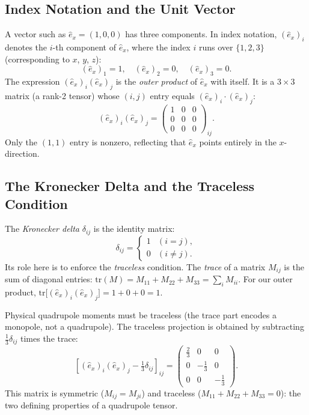 \documentclass[%
 reprint, amsmath,amssymb, aps, prb, ]{revtex4-2}
\numberwithin{equation}{section}
\newcommand{\ehat}[1]{\hat{e}_{#1}}
\begin{document}
\subsection{Index Notation and the Unit Vector}

A vector such as $\ehat{x} = (1, 0, 0)$ has three components.
In index notation, $(\ehat{x})_i$ denotes the $i$-th component of $\ehat{x}$, where the index $i$ runs over $\{1, 2, 3\}$ (corresponding to $x$, $y$, $z$):
\begin{equation}
(\ehat{x})_1 = 1, \quad (\ehat{x})_2 = 0, \quad (\ehat{x})_3 = 0.
\end{equation}
The expression $(\ehat{x})_i(\ehat{x})_j$ is the \emph{outer product} of $\ehat{x}$ with itself.
It is a $3\times 3$ matrix (a rank-2 tensor) whose $(i,j)$ entry equals $(\ehat{x})_i \cdot (\ehat{x})_j$:
\begin{equation}
(\ehat{x})_i(\ehat{x})_j =
\begin{pmatrix} 1 & 0 & 0 \\ 0 & 0 & 0 \\ 0 & 0 & 0 \end{pmatrix}_{ij}.
\end{equation}
Only the $(1,1)$ entry is nonzero, reflecting that $\ehat{x}$ points entirely in the $x$-direction.

\subsection{The Kronecker Delta and the Traceless Condition}

The \emph{Kronecker delta} $\delta_{ij}$ is the identity matrix:
\begin{equation}
\delta_{ij} = \begin{cases} 1 & (i = j), \\ 0 & (i \neq j). \end{cases}
\end{equation}
Its role here is to enforce the \emph{traceless} condition.
The \emph{trace} of a matrix $M_{ij}$ is the sum of diagonal entries: $\mathrm{tr}(M) = M_{11} + M_{22} + M_{33} = \sum_i M_{ii}$.
For our outer product, $\mathrm{tr}\bigl[(\ehat{x})_i(\ehat{x})_j\bigr] = 1 + 0 + 0 = 1$.

Physical quadrupole moments must be traceless (the trace part encodes a monopole, not a quadrupole).
The traceless projection is obtained by subtracting $\frac{1}{3}\delta_{ij}$ times the trace:
\begin{equation}
\left[(\ehat{x})_i(\ehat{x})_j - \tfrac{1}{3}\delta_{ij}\right]_{ij}
= \begin{pmatrix} \tfrac{2}{3} & 0 & 0 \\ 0 & -\tfrac{1}{3} & 0 \\ 0 & 0 & -\tfrac{1}{3} \end{pmatrix}.
\end{equation}
This matrix is symmetric ($M_{ij} = M_{ji}$) and traceless ($M_{11} + M_{22} + M_{33} = 0$): the two defining properties of a quadrupole tensor.
\end{document}

